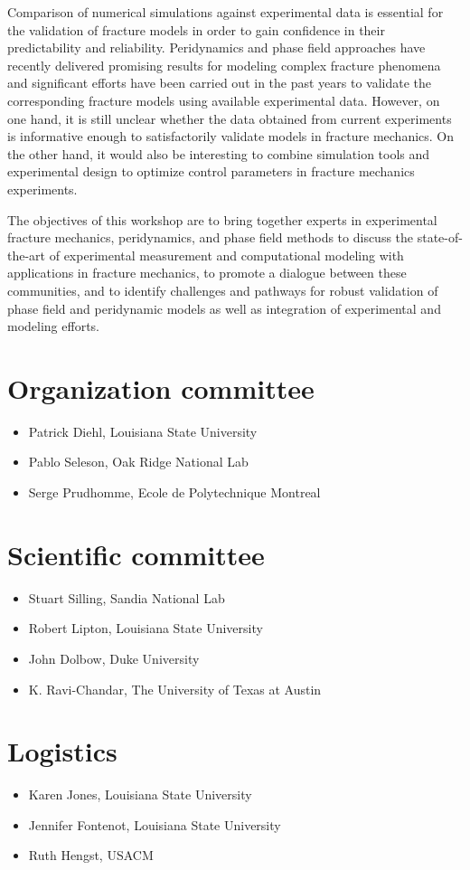 Comparison of numerical simulations against experimental data is essential
for the validation of fracture models in order to gain confidence in their
predictability and reliability. Peridynamics and phase field approaches have recently
delivered promising results for modeling complex fracture phenomena and significant
efforts have been carried out in the past years to validate the corresponding
fracture models using available experimental data. However, on one hand, it is still
unclear whether the data obtained from current experiments is informative enough to
satisfactorily validate models in fracture mechanics. On the other hand, it would also be
interesting to combine simulation tools and experimental design to optimize
control parameters in fracture mechanics experiments.

The objectives of this workshop are to bring together experts in experimental fracture mechanics,
peridynamics, and phase field methods to discuss the state-of-the-art of experimental
measurement and computational modeling with applications in fracture mechanics, to promote
a dialogue between these communities, and to identify challenges and pathways for robust validation
of phase field and peridynamic models as well as integration of experimental and modeling efforts.

\section*{Organization committee }
\begin{itemize}
\item Patrick Diehl, Louisiana State University
\item Pablo Seleson, Oak Ridge National Lab
\item Serge Prudhomme, Ecole de Polytechnique Montreal
\end{itemize}

\section*{Scientific committee}
\begin{itemize}
\item Stuart Silling, Sandia National Lab
\item Robert Lipton, Louisiana State University
\item John Dolbow, Duke University
\item K. Ravi-Chandar, The University of Texas at Austin
\end{itemize}

\section*{Logistics}
\begin{itemize}
\item Karen Jones, Louisiana State University
\item Jennifer Fontenot, Louisiana State University
\item Ruth Hengst, USACM
\end{itemize}

